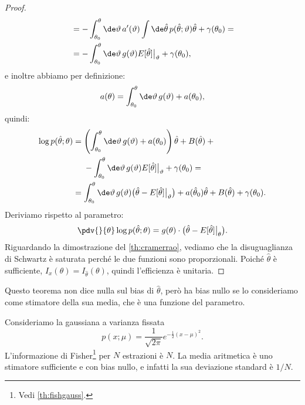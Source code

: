 \begin{proof}
\begin{align*}
		&= - \int_{\theta_0}^\theta \de\vartheta\, a'(\vartheta)
		\int\de\hat\theta\, p(\hat\theta;\vartheta) \hat\theta
		+ \gamma(\theta_0) = \\
		&= - \int_{\theta_0}^\theta \de\vartheta\, g(\vartheta) E[\hat\theta]\big|_{\vartheta}
		+ \gamma(\theta_0),
	\end{align*}
	e inoltre abbiamo per definizione:
	\begin{equation*}
		a(\theta)
		= \int_{\theta_0}^\theta \de\vartheta\, g(\vartheta) + a(\theta_0),
	\end{equation*}
	quindi:
	\begin{align*}
		\log p(\hat\theta;\theta)
		&= \left( \int_{\theta_0}^\theta \de\vartheta\, g(\vartheta) + a(\theta_0) \right) \hat\theta
		+ B(\hat\theta) + {}\\
		&\phantom{{}={}}- \int_{\theta_0}^\theta \de\vartheta\, g(\vartheta) E[\hat\theta]\big|_{\vartheta} + \gamma(\theta_0) = \\
		&= \int_{\theta_0}^\theta \de\vartheta\, g(\vartheta) \big(\hat\theta-E[\hat\theta]\big|_{\vartheta}\big)
		+ a(\hat\theta_0)\hat\theta + B(\hat\theta) + \gamma(\theta_0).
	\end{align*}
	Deriviamo rispetto al parametro:
	\begin{equation*}
		\pdv{}{\theta} \log p(\hat\theta;\theta)
		= g(\theta) \cdot \big(\hat\theta-E[\hat\theta]\big|_{\theta}\big).
	\end{equation*}
	Riguardando la dimostrazione del \autoref{th:cramerrao},
	vediamo che la disuguaglianza di Schwartz è saturata perché le due funzioni sono proporzionali.
	Poiché $\hat\theta$ è sufficiente, $I_x(\theta)=I_{\hat\theta}(\theta)$,
	quindi l'efficienza è unitaria.
\end{proof}

Questo teorema non dice nulla sul bias di $\hat\theta$,
però ha bias nullo se lo consideriamo come stimatore della sua media,
che è una funzione del parametro.

\begin{example}
	Consideriamo la gaussiana a varianza fissata
	\begin{equation*}
		p(x;\mu)
		= \frac1{\sqrt{2\pi}} e^{-\frac12 (x-\mu)^2}.
	\end{equation*}
	L'informazione di Fisher\footnote{Vedi \autoref{th:fishgauss}.} per $N$ estrazioni è $N$.
	La media aritmetica è uno stimatore sufficiente e con bias nullo,
	e infatti la sua deviazione standard è $1/N$.
\end{example}


